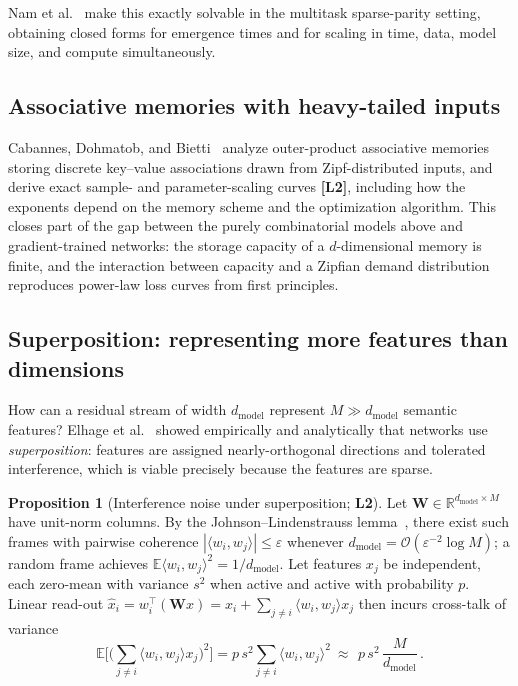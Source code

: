\documentclass[11pt,a4paper]{article}
\theoremstyle{definition}
\newtheorem{proposition}[theorem]{Proposition}
\begin{document}
Nam et al.~\cite{nam2024exactly} make this exactly solvable in the multitask sparse-parity setting, obtaining closed forms for emergence times and for scaling in time, data, model size, and compute simultaneously.

\subsection{Associative memories with heavy-tailed inputs}

Cabannes, Dohmatob, and Bietti~\cite{cabannes2024associative} analyze outer-product associative memories storing discrete key--value associations drawn from Zipf-distributed inputs, and derive exact sample- and parameter-scaling curves \textbf{[L2]}, including how the exponents depend on the memory scheme and the optimization algorithm. This closes part of the gap between the purely combinatorial models above and gradient-trained networks: the storage capacity of a $d$-dimensional memory is finite, and the interaction between capacity and a Zipfian demand distribution reproduces power-law loss curves from first principles.

\subsection{Superposition: representing more features than dimensions}
\label{subsec:superposition}

How can a residual stream of width $d_{\mathrm{model}}$ represent $M \gg d_{\mathrm{model}}$ semantic features? Elhage et al.~\cite{elhage2022toy} showed empirically and analytically that networks use \emph{superposition}: features are assigned nearly-orthogonal directions and tolerated interference, which is viable precisely because the features are sparse.

\begin{proposition}[Interference noise under superposition; \textbf{L2}]
Let $\mathbf{W}\in\mathbb{R}^{d_{\mathrm{model}}\times M}$ have unit-norm columns. By the Johnson--Lindenstrauss lemma~\cite{johnson1984extensions}, there exist such frames with pairwise coherence $|\langle w_i,w_j\rangle|\le\varepsilon$ whenever $d_{\mathrm{model}} = \mathcal{O}(\varepsilon^{-2}\log M)$; a random frame achieves $\mathbb{E}\langle w_i,w_j\rangle^2 = 1/d_{\mathrm{model}}$. Let features $x_j$ be independent, each zero-mean with variance $s^2$ when active and active with probability $p$. Linear read-out $\hat x_i = w_i^\top(\mathbf{W}x) = x_i + \sum_{j\ne i}\langle w_i,w_j\rangle x_j$ then incurs cross-talk of variance
\begin{equation}
  \mathbb{E}\Big[\big(\textstyle\sum_{j\ne i}\langle w_i,w_j\rangle x_j\big)^2\Big]
  = p\,s^2\sum_{j\ne i}\langle w_i,w_j\rangle^2
  \ \approx\ \boxed{\,p\,s^2\,\frac{M}{d_{\mathrm{model}}}\,} .
\end{equation}
\end{proposition}
\end{document}
